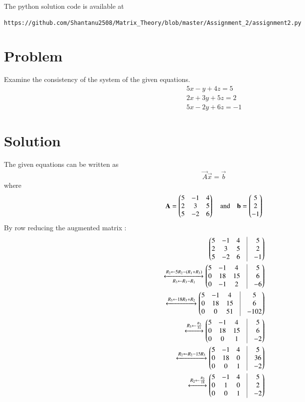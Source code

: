 \documentclass[journal,12pt,twocolumn]{IEEEtran}
\begin{document}
The python solution code is available at
\begin{lstlisting}
https://github.com/Shantanu2508/Matrix_Theory/blob/master/Assignment_2/assignment2.py
\end{lstlisting}
%
\section{Problem}
Examine the consistency of the system of the given equations.
\begin{align}
	5x -  y + 4z = 5 \nonumber \\
	2x + 3y + 5z = 2 \\
	5x - 2y + 6z =-1 \nonumber
\end{align}

\section{Solution}
	The given equations can be written as
\begin{align*}
	\vec{A} \vec{x} = \vec{b}  
\end{align*}
where
\begin{align}
	\mathbf{A} = \begin{pmatrix} 5 & -1 & 4 \\ 2 &  3 & 5 \\ 5 & -2 & 6 \end{pmatrix}
	\quad \text{and} \quad
	\mathbf{b} = \begin{pmatrix} 5 \\  2 \\ -1\end{pmatrix}
\end{align}
By row reducing the augmented matrix :
\begin{align}
	\myvec{ 5 & -1 & 4 &\vrule & 5 \\ 2 & 3 & 5 &\vrule & 2 \\ 5 & -2 & 6 &\vrule & -1}
	\\
	\xleftrightarrow[R_3 \leftarrow R_3-R_1]{R_2 \leftarrow 5R_2-(R_1+R_3)}
	\myvec{5 &-1  & 4  &\vrule & 5 \\ 0 & 18 & 15 &\vrule & 6 \\ 0 & -1 & 2 &\vrule & -6}
	\\
	\xleftrightarrow[]{R_3 \leftarrow 18R_3+R_2}
	\myvec{5 & -1 &  4 &\vrule & 5 \\ 0 & 18 & 15 &\vrule & 6 \\ 0 & 0 & 51 &\vrule & -102}
	\\
	\xleftrightarrow[]{R_3 \leftarrow \frac{R_3}{51}}
	\myvec{5 & -1 &  4 &\vrule & 5 \\ 0 & 18 & 15 &\vrule & 6 \\ 0 & 0 & 1 &\vrule & -2}
	\\
	\xleftrightarrow[]{R_2 \leftarrow R_2-15 R_3}
	\myvec{5 & -1 &  4 &\vrule & 5 \\ 0 & 18 & 0 &\vrule & 36 \\ 0 & 0 & 1 &\vrule & -2}
	\\
	\xleftrightarrow[]{R_2 \leftarrow \frac{R_2}{18}}
	\myvec{5 & -1 &  4 &\vrule & 5 \\ 0 & 1 & 0 &\vrule & 2 \\ 0 & 0 & 1 &\vrule & -2}
\end{align}
\end{document}
